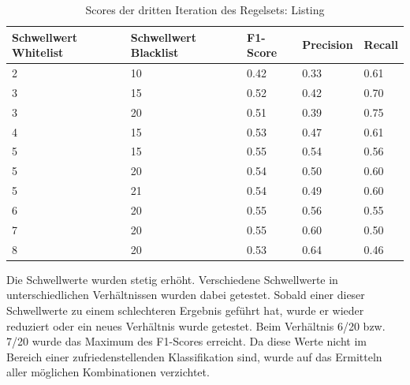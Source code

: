 \begin{table}[H]
	\caption{Scores der dritten Iteration des Regelsets: Listing}
	\centering
\begin{tabular}{|l|l|l|l|l|}
	\hline
	Schwellwert Whitelist & Schwellwert Blacklist & F1-Score & Precision & Recall\\
	\hline
	2 & 10 & 0.42 & 0.33 & 0.61 \\
	3 & 15 & 0.52 & 0.42 & 0.70 \\
	3 & 20 & 0.51 & 0.39 & 0.75 \\
	4 & 15 & 0.53 & 0.47 & 0.61 \\
	5 & 15 & 0.55 & 0.54 & 0.56 \\
	5 & 20 & 0.54 & 0.50 & 0.60 \\
	5 & 21 & 0.54 & 0.49 & 0.60 \\
	6 & 20 & 0.55 & 0.56 & 0.55 \\
	7 & 20 & 0.55 & 0.60 & 0.50 \\
	8 & 20 & 0.53 & 0.64 & 0.46 \\
	\hline
\end{tabular}
\end{table}
Die Schwellwerte wurden stetig erhöht.
Verschiedene Schwellwerte in unterschiedlichen Verhältnissen wurden dabei getestet.
Sobald einer dieser Schwellwerte zu einem schlechteren Ergebnis geführt hat, wurde er wieder reduziert oder ein neues Verhältnis wurde getestet.
Beim Verhältnis 6/20 bzw. 7/20 wurde das Maximum des F1-Scores erreicht.
Da diese Werte nicht im Bereich einer zufriedenstellenden Klassifikation sind, wurde auf das Ermitteln aller möglichen Kombinationen verzichtet.
